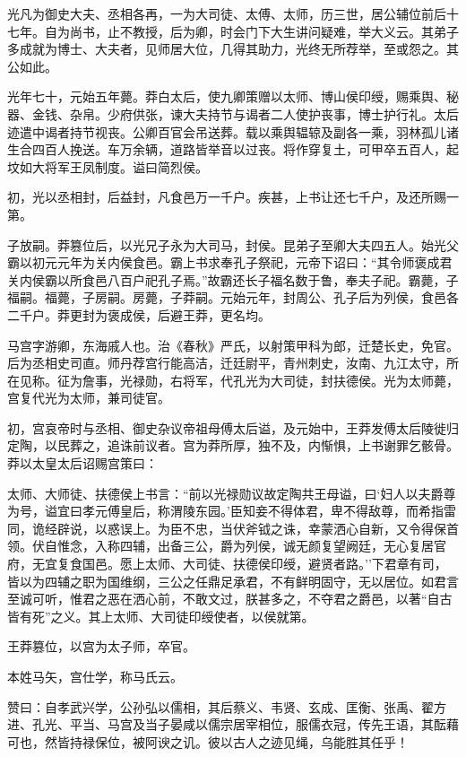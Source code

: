 \documentclass[]{article}
\begin{document}
光凡为御史大夫、丞相各再，一为大司徒、太傅、太师，历三世，居公辅位前后十七年。自为尚书，止不教授，后为卿，时会门下大生讲问疑难，举大义云。其弟子多成就为博士、大夫者，见师居大位，几得其助力，光终无所荐举，至或怨之。其公如此。

光年七十，元始五年薨。莽白太后，使九卿策赠以太师、博山侯印绶，赐乘舆、秘器、金钱、杂帛。少府供张，谏大夫持节与谒者二人使护丧事，博士护行礼。太后迹遣中谒者持节视丧。公卿百官会吊送葬。载以乘舆辒辌及副各一乘，羽林孤儿诸生合四百人挽送。车万余辆，道路皆举音以过丧。将作穿复土，可甲卒五百人，起坟如大将军王凤制度。谥曰简烈侯。

初，光以丞相封，后益封，凡食邑万一千户。疾甚，上书让还七千户，及还所赐一第。

子放嗣。莽篡位后，以光兄子永为大司马，封侯。昆弟子至卿大夫四五人。始光父霸以初元元年为关内侯食邑。霸上书求奉孔子祭祀，元帝下诏曰：``其令师褒成君关内侯霸以所食邑八百户祀孔子焉。''故霸还长子福名数于鲁，奉夫子祀。霸薨，子福嗣。福薨，子房嗣。房薨，子莽嗣。元始元年，封周公、孔子后为列侯，食邑各二千户。莽更封为褒成侯，后避王莽，更名均。

马宫字游卿，东海戚人也。治《春秋》严氏，以射策甲科为郎，迁楚长史，免官。后为丞相史司直。师丹荐宫行能高洁，迁廷尉平，青州刺史，汝南、九江太守，所在见称。征为詹事，光禄勋，右将军，代孔光为大司徒，封扶德侯。光为太师薨，宫复代光为太师，兼司徒官。

初，宫哀帝时与丞相、御史杂议帝祖母傅太后谥，及元始中，王莽发傅太后陵徙归定陶，以民葬之，追诛前议者。宫为莽所厚，独不及，内惭惧，上书谢罪乞骸骨。莽以太皇太后诏赐宫策曰：

太师、大师徒、扶德侯上书言：``前以光禄勋议故定陶共王母谥，曰`妇人以夫爵尊为号，谥宜曰孝元傅皇后，称渭陵东园。'臣知妾不得体君，卑不得敌尊，而希指雷同，诡经辟说，以惑误上。为臣不忠，当伏斧钺之诛，幸蒙洒心自新，又令得保首领。伏自惟念，入称四辅，出备三公，爵为列侯，诚无颜复望阙廷，无心复居官府，无宜复食国邑。愿上太师、大司徒、扶德侯印绶，避贤者路。''下君章有司，皆以为四辅之职为国维纲，三公之任鼎足承君，不有鲜明固守，无以居位。如君言至诚可听，惟君之恶在洒心前，不敢文过，朕甚多之，不夺君之爵邑，以著``自古皆有死''之义。其上太师、大司徒印绶使者，以侯就第。

王莽篡位，以宫为太子师，卒官。

本姓马矢，宫仕学，称马氏云。

赞曰：自孝武兴学，公孙弘以儒相，其后蔡义、韦贤、玄成、匡衡、张禹、翟方进、孔光、平当、马宫及当子晏咸以儒宗居宰相位，服儒衣冠，传先王语，其酝藉可也，然皆持禄保位，被阿谀之讥。彼以古人之迹见绳，乌能胜其任乎！
\end{document}
